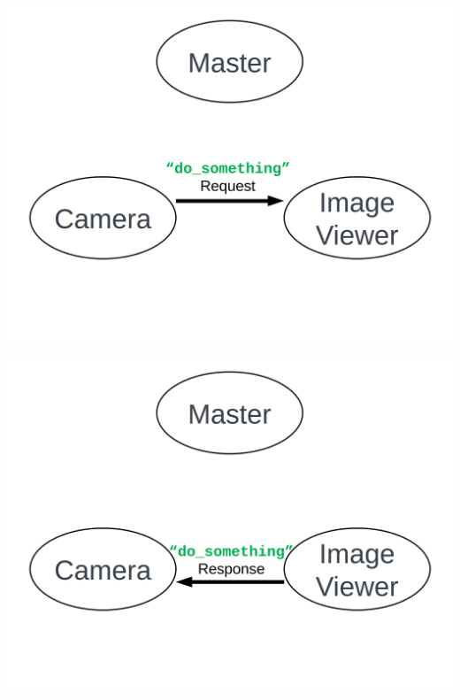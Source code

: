 \documentclass{beamer}
\begin{document}
\begin{frame}[plain]{}
    \centering
    \includegraphics[width =1.0\linewidth]{figures/service4.png}                                                              
  \end{frame} 
\begin{frame}[plain]{}
    \centering
    \includegraphics[width =1.0\linewidth]{figures/service5.png}                                                              
  \end{frame}
\end{document}
